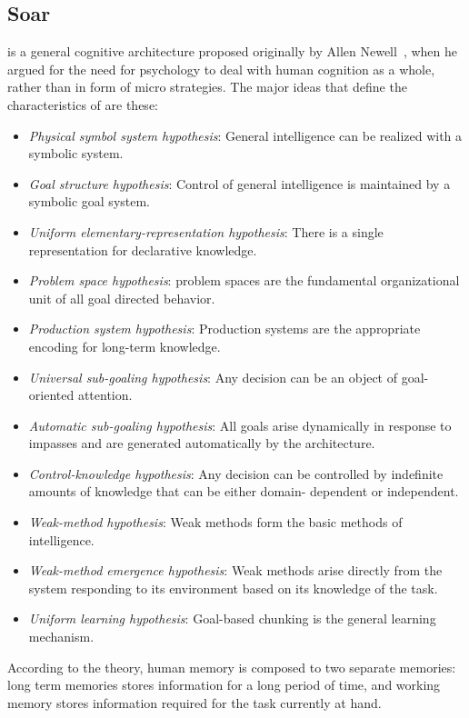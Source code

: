 
\subsection{Soar}

\soar is a general cognitive architecture proposed originally by Allen
Newell~\cite{Newell:1990aa,27702}, when he argued for the need for
psychology to deal with human cognition as a whole, rather than in
form of micro strategies. The major ideas\cite{Lewis:2001aa, 27702} that
define the characteristics of \soar are these:

\begin{itemize}
\item \emph{Physical symbol system hypothesis}: General intelligence
  can be realized with a symbolic system\cite{Newell1980135}.
\item \emph{Goal structure hypothesis}: Control of general
  intelligence is maintained by a symbolic goal system.
\item \emph{Uniform elementary-representation hypothesis}: There is a
  single representation for declarative knowledge.
\item \emph{Problem space hypothesis}: problem spaces are the
  fundamental organizational unit of all goal directed behavior.
\item \emph{Production system hypothesis}: Production systems are the
  appropriate encoding for long-term knowledge.
\item \emph{Universal sub-goaling hypothesis}: Any decision can be an
  object of goal-oriented attention.
\item \emph{Automatic sub-goaling hypothesis}: All goals arise
  dynamically in response to impasses and are generated automatically
  by the architecture.
\item \emph{Control-knowledge hypothesis}: Any decision can be
  controlled by indefinite amounts of knowledge that can be either domain-
  dependent or independent.
\item \emph{Weak-method hypothesis}:  Weak methods form the basic
  methods of intelligence. %
\item \emph{Weak-method emergence hypothesis}:  Weak methods arise
  directly from the system responding to its environment based on its knowledge of the
  task.
\item \emph{Uniform learning hypothesis}: Goal-based chunking is the
  general learning mechanism.
\end{itemize}
According to the \soar theory, human memory is composed to two
separate memories: long term memories stores information for a long
period of time, and working memory stores information required for the
task currently at hand.


